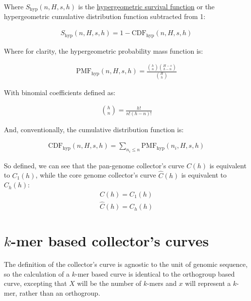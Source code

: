 \documentclass[12pt]{scrartcl}
\begin{document}
Where $S_\text{hyp}(n, H, s, h)$ is the \href{https://docs.scipy.org/doc/scipy/reference/generated/scipy.stats.hypergeom.html}{hypergeometric survival function} or the hypergeometric cumulative distribution function subtracted from 1:

\begin{align}
    S_\text{hyp}(n, H, s, h) = 1 - \text{CDF}_\text{hyp}(n, H, s, h)
\end{align}

Where for clarity, the hypergeometric probability mass function is:

\begin{align}
    \text{PMF}_\text{hyp}(n, H, s, h) = \frac{\binom{h}{n}\binom{H-s}{h-n}}{\binom{H}{h}}
\end{align}

With binomial coefficients defined as:

\begin{align}
    \binom{h}{n} = \frac{h!}{n!(h-n)!}
\end{align}

And, conventionally, the cumulative distribution function is:

\begin{align}
    \text{CDF}_\text{hyp}(n, H, s, h) = \sum_{n_i \leq n} \text{PMF}_\text{hyp}(n_i, H, s, h)
\end{align}

So defined, we can see that the pan-genome collector's curve $C(h)$ is equivalent to $C_1(h)$, while the core genome collector's curve $\hat{C}(h)$ is equivalent to $C_h(h)$:
\begin{align}
    C(h) = C_1(h) \\
    \hat{C}(h) = C_h(h)
\end{align}

\section*{$k$-mer based collector's curves}

The definition of the collector's curve is agnostic to the unit of genomic sequence, so the calculation of a $k$-mer based curve is identical to the orthogroup based curve, excepting that $X$ will be the number of $k$-mers and $x$ will represent a $k$-mer, rather than an orthogroup.
\end{document}
